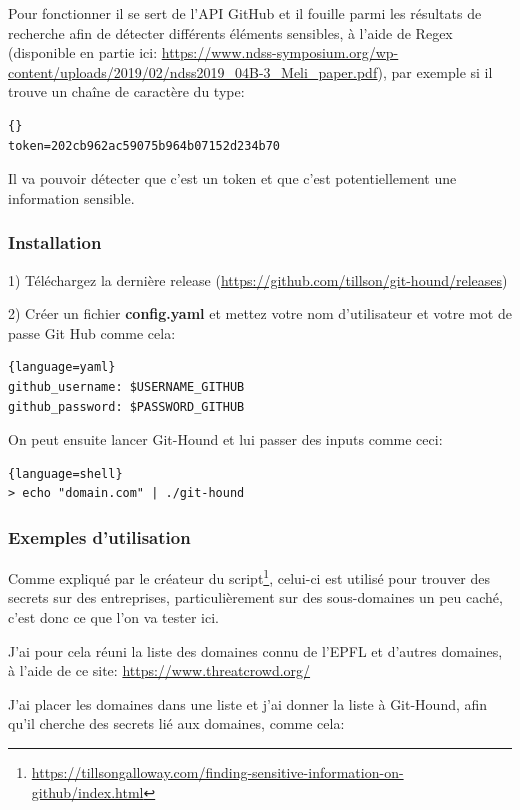 Pour fonctionner il se sert de l'API GitHub et il fouille parmi les résultats de recherche afin de détecter 
différents éléments sensibles, à l'aide de Regex (disponible en partie ici: \url{https://www.ndss-symposium.org/wp-content/uploads/2019/02/ndss2019_04B-3_Meli_paper.pdf}), 
par exemple si il trouve un chaîne de caractère du type:

\begin{lstlisting}{}
token=202cb962ac59075b964b07152d234b70
\end{lstlisting}

Il va pouvoir détecter que c'est un token et que c'est potentiellement une information sensible.

\subsubsection{Installation}

1) Téléchargez la dernière release (\url{https://github.com/tillson/git-hound/releases})

2) Créer un fichier {\bfseries config.yaml} et mettez votre nom d'utilisateur et votre mot de passe Git Hub comme cela:

\begin{lstlisting}{language=yaml}
github_username: $USERNAME_GITHUB
github_password: $PASSWORD_GITHUB
\end{lstlisting}

On peut ensuite lancer Git-Hound et lui passer des inputs comme ceci:

\begin{lstlisting}{language=shell}
> echo "domain.com" | ./git-hound
\end{lstlisting}

\subsubsection{Exemples d'utilisation}

Comme expliqué par le créateur du script\footnote{\url{https://tillsongalloway.com/finding-sensitive-information-on-github/index.html}}, 
celui-ci est utilisé pour trouver des secrets sur des entreprises, particulièrement sur des sous-domaines un peu caché, c'est donc ce que l'on va tester ici.

J'ai pour cela réuni la liste des domaines connu de l'EPFL et d'autres domaines, à l'aide de ce site: \url{https://www.threatcrowd.org/}

J'ai placer les domaines dans une liste et j'ai donner la liste à Git-Hound, afin qu'il cherche des secrets lié aux domaines, comme cela:

